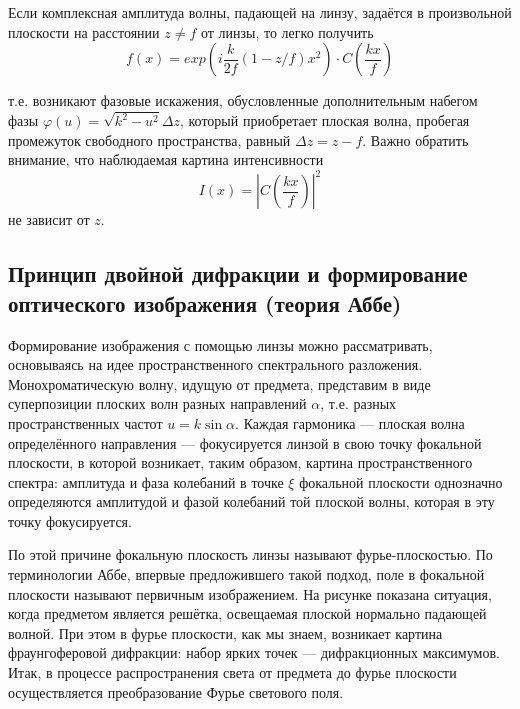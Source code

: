 Если комплексная амплитуда волны, падающей на линзу, задаётся в произвольной плоскости на расстоянии $z \ne f$ от линзы, то легко получить
\[
    f(x) = exp\left(i\frac{k}{2f}(1 - z / f)x^2\right) \cdot C\left(\frac{kx}{f}\right)
\]

т.е. возникают фазовые искажения, обусловленные дополнительным набегом фазы $\varphi(u) = \sqrt{k^2 - u^2}\Delta z$, который приобретает плоская волна, пробегая промежуток свободного пространства, равный $\Delta z = z - f$. Важно обратить внимание, что наблюдаемая картина интенсивности
\[
I(x) = \left|C\left(\frac{kx}{f }\right)\right|^2
\]
не зависит от $z$.

\subsection{Принцип двойной дифракции и формирование оптического изображения (теория Аббе)}

\begin{figure}[ht!]
\end{figure}

Формирование изображения с помощью линзы можно рассматривать, основываясь на идее пространственного спектрального разложения. Монохроматическую волну, идущую от предмета, представим в виде суперпозиции плоских волн разных направлений $\alpha$, т.е.  разных пространственных частот $u=k\sin\alpha$. Каждая гармоника --- плоская волна определённого направления --- фокусируется линзой в свою точку фокальной плоскости, в которой возникает, таким образом, картина пространственного спектра: амплитуда и фаза колебаний в точке $\xi$ фокальной плоскости однозначно определяются амплитудой и фазой колебаний той плоской волны, которая в эту точку фокусируется.

По этой причине фокальную плоскость линзы называют фурье-плоскостью. По терминологии Аббе, впервые предложившего такой подход, поле в фокальной плоскости называют первичным изображением. На рисунке показана ситуация, когда предметом является решётка, освещаемая плоской нормально падающей волной. При этом в фурье плоскости, как мы знаем, возникает картина фраунгоферовой дифракции: набор ярких точек --- дифракционных максимумов. Итак, в процессе распространения света от предмета до фурье плоскости осуществляется преобразование Фурье светового поля.

